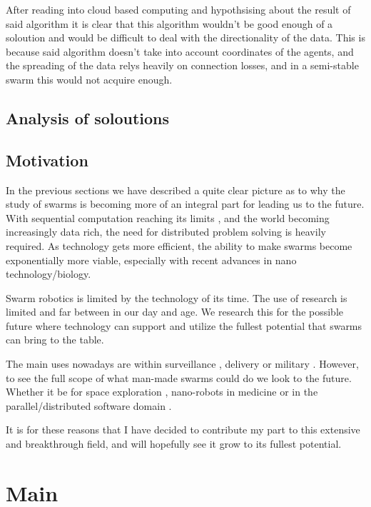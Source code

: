 \documentclass{UoYCSproject}
\begin{document}
After reading into cloud based computing and hypothsising about the result of said algorithm it is clear that this algorithm wouldn't be good enough of a soloution and would be difficult to deal with the directionality of the data.
This is because said algorithm doesn't take into account coordinates of the agents, and the spreading of the data relys heavily on connection losses, and in a semi-stable swarm this would not acquire enough.


\section{Analysis of soloutions}
\label{sec:Analysis of soloutions}



\section{Motivation}
\label{sec:Motivation}

In the previous sections we have described a quite clear picture as to why the study of swarms is becoming more of an integral part for leading us to the future. 
With sequential computation reaching its limits \cite{CPU speed}, and the world becoming increasingly data rich, the need for distributed problem solving is heavily required. 
As technology gets more efficient, the ability to make swarms become exponentially more viable, especially with recent advances in nano technology/biology.

Swarm robotics is limited by the technology of its time. 
The use of research is limited and far between in our day and age. 
We research this for the possible future where technology can support and utilize the fullest potential that swarms can bring to the table.

The main uses nowadays are within surveillance \cite{UAV, HiveMind}, delivery or military \cite{Swarm robotics reviewed}. 
However, to see the full scope of what man-made swarms could do we look to the future. 
Whether it be for space exploration \cite{Space exploration}, nano-robots in medicine or in the parallel/distributed software domain \cite{blockchainandSwarm}. 

It is for these reasons that I have decided to contribute my part to this extensive and breakthrough field, and will hopefully see it grow to its fullest potential.


\chapter{Main}
\label{cha:Main}
\end{document}
